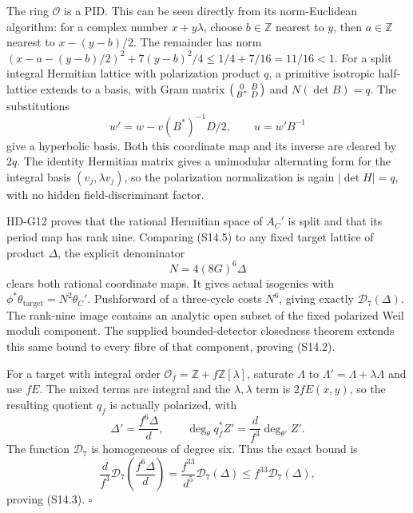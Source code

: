The ring \(\mathcal O\) is a PID. This can be seen directly
from its norm-Euclidean algorithm: for a complex number
\(x+y\lambda\), choose \(b\in\mathbb Z\) nearest to \(y\),
then \(a\in\mathbb Z\) nearest to \(x-(y-b)/2\).
The remainder has norm
\((x-a-(y-b)/2)^2+7(y-b)^2/4\le
1/4+7/16=11/16<1\).
For a split integral Hermitian lattice with polarization
product \(q\), a primitive isotropic half-lattice extends
to a basis, with Gram matrix
\(\begin{psmallmatrix}0&B\\B^*&D\end{psmallmatrix}\) and
\(N(\det B)=q\). The substitutions
\[
 w'=w-v(B^*)^{-1}D/2,\qquad u=w'B^{-1}
\]
give a hyperbolic basis. Both this coordinate map and its
inverse are cleared by \(2q\). The identity Hermitian matrix
gives a unimodular alternating form for the integral basis
\((v_j,\lambda v_j)\), so the polarization normalization is
again \(|\det H|=q\), with no hidden field-discriminant factor.

HD-G12 proves that the rational Hermitian space of \(A_C'\)
is split and that its period map has rank nine.
Comparing (S14.5) to any fixed target lattice of product
\(\Delta\), the explicit denominator
\[
 N=4(8G)^6\Delta
\]
clears both rational coordinate maps. It gives actual
isogenies with
\(\phi^*\theta_{\mathrm{target}}=N^2\theta_C'\).
Pushforward of a three-cycle costs \(N^6\), giving exactly
\(\mathcal D_7(\Delta)\). The rank-nine image contains an
analytic open subset of the fixed polarized Weil moduli
component. The supplied bounded-detector closedness theorem
extends this same bound to every fibre of that component,
proving (S14.2).

For a target with integral order
\(\mathcal O_f=\mathbb Z+f\mathbb Z[\lambda]\), saturate
\(\Lambda\) to \(\Lambda'=\Lambda+\lambda\Lambda\) and
use \(fE\). The mixed terms are integral and the
\(\lambda,\lambda\) term is \(2fE(x,y)\), so the resulting
quotient \(q_f\) is actually polarized, with
\[
 \Delta'=\frac{f^6\Delta}{d},\qquad
 \deg_\theta q_f^*Z'=\frac d{f^3}\deg_{\theta'}Z'.
\]
The function \(\mathcal D_7\) is homogeneous of degree six.
Thus the exact bound is
\[
 \frac d{f^3}\mathcal D_7\left(\frac{f^6\Delta}{d}\right)
 =\frac{f^{33}}{d^5}\mathcal D_7(\Delta)
 \le f^{33}\mathcal D_7(\Delta),
\]
proving (S14.3). \(\square\)

